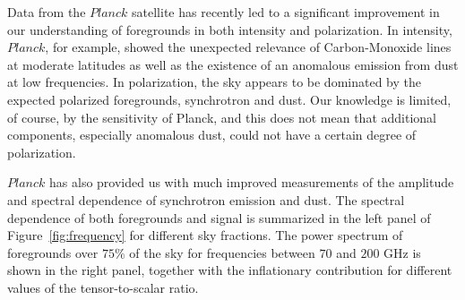 Data from the $Planck$ satellite has recently led to a significant improvement in our understanding of foregrounds in both intensity and polarization. In intensity, $Planck$, for example, showed the unexpected relevance of Carbon-Monoxide lines at moderate latitudes as well as the existence of an anomalous emission from dust at low frequencies. In polarization, the sky appears to be dominated by the expected polarized foregrounds, synchrotron and dust. Our knowledge is limited, of course, by the sensitivity of Planck, and this does not mean that additional components, especially anomalous dust, could not have a certain degree of polarization. 

$Planck$ has also provided us with much improved measurements of the amplitude and spectral dependence of synchrotron emission and dust. The spectral dependence of both foregrounds and signal is summarized in the left panel of Figure~\ref{fig:frequency} for different sky fractions. The power spectrum of foregrounds over $75\%$ of the sky for frequencies between $70$ and $200$ GHz is shown in the right panel, together with the inflationary contribution for different values of the tensor-to-scalar ratio.

